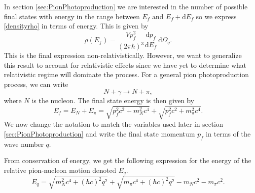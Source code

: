 In section \ref{sec:PionPhotoproduction} we are interested in the number of possible final states with energy in the range between $E_f$ and $E_f + \text{d}E_f$ so we express \eqref{densityrho} in terms of energy. This is given by
\begin{equation} \label{densityenergy}
	\rho(E_f) = \frac{V p_f^2}{(2\pi \hbar)^3} \frac{\text{d}p_f}{\text{d}E_f} \, \text{d}\Omega_q.
\end{equation}
This is the final expression non-relativistically. However, we want to generalize this result to account for relativistic effects since we have yet to determine what relativistic regime will dominate the process. For a general pion photoproduction process, we can write
\begin{equation} \label{twobody}
	N + \gamma \rightarrow N+\pi,
\end{equation}
where $N$ is the nucleon. The final state energy is then given by \cite{Kernebog}
\begin{equation} \label{Ef}
	E_f = E_N + E_\pi = \sqrt{p_f^2 c^2 +m_N^2c^4} + \sqrt{p_f^2c^2 + m^2_\pi c^4}.
\end{equation}
We now change the notation to match the variables used later in section \ref{sec:PionPhotoproduction} and write the final state momentum $p_f$ in terms of the wave number $q$. 


From conservation of energy, we get the following expression for the energy of the relative pion-nucleon motion denoted $E_q$. 
\begin{equation} \label{Eq}
	E_q = \sqrt{m_N^2 c^4+(\hbar c)^2q^2} + \sqrt{m_\pi c^4+(\hbar c)^2 q^2}-m_N c^2-m_\pi c^2.
\end{equation}


